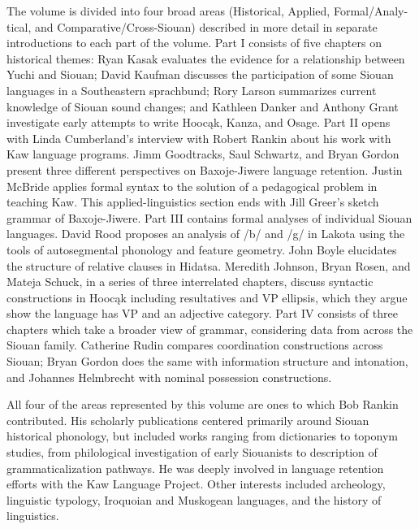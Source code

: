 \begin{refsection}
The volume is divided into four broad areas (Historical, Applied, Formal/Analy-tical, and Comparative/Cross-Siouan) described in more detail in separate introductions to each part of the volume. Part I consists of five chapters on historical themes: Ryan Kasak evaluates the evidence for a relationship between Yuchi and Siouan; David Kaufman discusses the participation of some Siouan languages in a Southeastern sprachbund; Rory Larson summarizes current knowledge of Siouan sound changes; and Kathleen Danker and Anthony Grant investigate early attempts to write Hooc\k{a}k, Kanza, and Osage.  Part II opens with Linda Cumberland's interview with Robert Rankin about his work with Kaw language programs. Jimm Goodtracks, Saul Schwartz, and Bryan Gordon present three different perspectives on Baxoje-Jiwere language retention. Justin McBride applies formal syntax to the solution of a pedagogical problem in teaching Kaw. This applied-linguistics section ends with Jill Greer's sketch grammar of Baxoje-Jiwere. Part III contains formal analyses of individual Siouan languages. David Rood proposes an analysis of /b/ and /g/ in Lakota using the tools of autosegmental phonology and feature geometry. John Boyle elucidates the structure of relative clauses in Hidatsa. Meredith Johnson, Bryan Rosen, and Mateja Schuck, in a series of three interrelated chapters, discuss syntactic constructions in Hooc\k{a}k including resultatives and VP ellipsis, which they argue show the language has VP and an adjective category. Part IV consists of three chapters which take a broader view of grammar, considering data from across the Siouan family.  Catherine Rudin compares coordination constructions across Siouan; Bryan Gordon does the same with information structure and intonation, and Johannes Helmbrecht with nominal possession constructions. 

All four of the areas represented by this volume are ones to which Bob Rankin contributed. His scholarly publications centered primarily around Siouan historical phonology, but included works ranging from dictionaries to toponym studies, from philological investigation of early Siouanists  to description of grammaticalization pathways. He was deeply involved in language retention efforts with the Kaw Language Project. Other interests included archeology, linguistic typology, Iroquoian and Muskogean languages, and the history of linguistics. 


\end{refsection}
